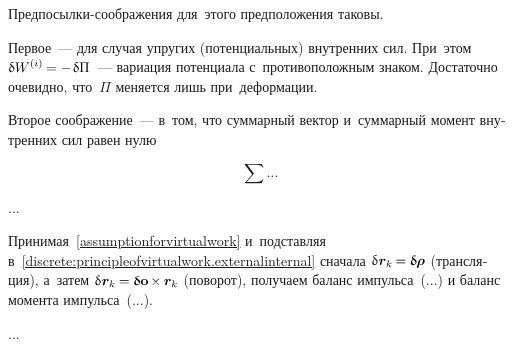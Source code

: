 \begin{otherlanguage}{russian}
\vspace{-0.1em} Предпосылки-соображения для~этого предположения таковы.

Первое~--- для случая упругих (потенциальных) внутренних сил. При~этом ${\variation{\internalwork} = - \hspace{.16ex} \variation{\Pi}}$~--- вариация потенциала с~противоположным знаком. Достаточно очевидно, что~$\Pi$ меняется лишь при~деформации.

Второе соображение~--- в~том, что суммарный вектор и~суммарный момент внутренних сил равен нулю

\begin{equation*}
\sum \ldots
\end{equation*}

...

Принимая~\eqref{assumptionforvirtualwork} и~подставляя в~\eqref{discrete:principleofvirtualwork.externalinternal} сначала ${\variation{\hspace{.1ex}\bm{r}_k} \hspace{-0.16ex} = \hspace{-0.08ex} \varvector{\hspace{-0.1ex}\bm{\rho}}}$ (трансляция), а~затем ${\variation{\hspace{.1ex}\bm{r}_k} \hspace{-0.16ex} = \hspace{-0.08ex} \varvector{\bm{o}} \hspace{-0.2ex} \times \hspace{-0.1ex} \bm{r}_k}$ (поворот), получаем баланс импульса~(...) и баланс момента импульса~(...).

...



\end{otherlanguage}



